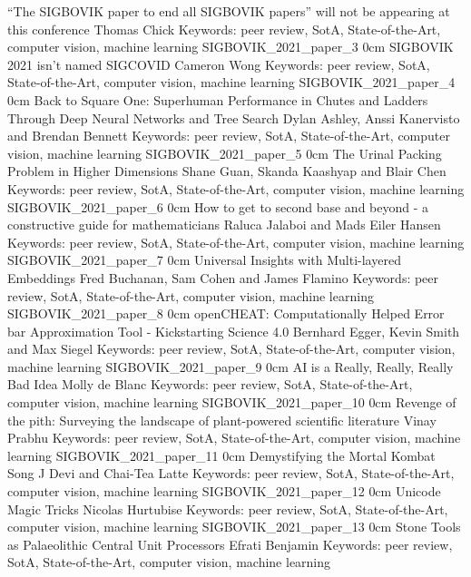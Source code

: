 \addpaper
	{``The SIGBOVIK paper to end all SIGBOVIK papers'' will not be appearing at this conference}
	{Thomas Chick}
	{Keywords: peer review, SotA, State-of-the-Art, computer vision, machine learning}
	{SIGBOVIK_2021_paper_3}
	{0cm}
	{}
\addpaper
	{SIGBOVIK 2021 isn't named SIGCOVID}
	{Cameron Wong}
	{Keywords: peer review, SotA, State-of-the-Art, computer vision, machine learning}
	{SIGBOVIK_2021_paper_4}
	{0cm}
	{}
\addpaper
	{Back to Square One: Superhuman Performance in Chutes and Ladders Through Deep Neural Networks and Tree Search}
	{Dylan Ashley, Anssi Kanervisto and Brendan Bennett}
	{Keywords: peer review, SotA, State-of-the-Art, computer vision, machine learning}
	{SIGBOVIK_2021_paper_5}
	{0cm}
	{}
\addpaper
	{The Urinal Packing Problem in Higher Dimensions}
	{Shane Guan, Skanda Kaashyap and Blair Chen}
	{Keywords: peer review, SotA, State-of-the-Art, computer vision, machine learning}
	{SIGBOVIK_2021_paper_6}
	{0cm}
	{}
\addpaper
	{How to get to second base and beyond - a constructive guide for mathematicians}
	{Raluca Jalaboi and Mads Eiler Hansen}
	{Keywords: peer review, SotA, State-of-the-Art, computer vision, machine learning}
	{SIGBOVIK_2021_paper_7}
	{0cm}
	{}
\addpaper
	{Universal Insights with Multi-layered Embeddings}
	{Fred Buchanan, Sam Cohen and James Flamino}
	{Keywords: peer review, SotA, State-of-the-Art, computer vision, machine learning}
	{SIGBOVIK_2021_paper_8}
	{0cm}
	{}
\addpaper
	{openCHEAT: Computationally Helped Error bar Approximation Tool - Kickstarting Science 4.0}
	{Bernhard Egger, Kevin Smith and Max Siegel}
	{Keywords: peer review, SotA, State-of-the-Art, computer vision, machine learning}
	{SIGBOVIK_2021_paper_9}
	{0cm}
	{}
\addpaper
	{AI is a Really, Really, Really Bad Idea}
	{Molly de Blanc}
	{Keywords: peer review, SotA, State-of-the-Art, computer vision, machine learning}
	{SIGBOVIK_2021_paper_10}
	{0cm}
	{}
\addpaper
	{Revenge of the pith: Surveying the landscape of plant-powered scientific literature}
	{Vinay Prabhu}
	{Keywords: peer review, SotA, State-of-the-Art, computer vision, machine learning}
	{SIGBOVIK_2021_paper_11}
	{0cm}
	{}
\addpaper
	{Demystifying the Mortal Kombat Song}
	{J Devi and Chai-Tea Latte}
	{Keywords: peer review, SotA, State-of-the-Art, computer vision, machine learning}
	{SIGBOVIK_2021_paper_12}
	{0cm}
	{}
\addpaper
	{Unicode Magic Tricks}
	{Nicolas Hurtubise}
	{Keywords: peer review, SotA, State-of-the-Art, computer vision, machine learning}
	{SIGBOVIK_2021_paper_13}
	{0cm}
	{}
\addpaper
	{Stone Tools as Palaeolithic Central Unit Processors}
	{Efrati Benjamin}
	{Keywords: peer review, SotA, State-of-the-Art, computer vision, machine learning}
